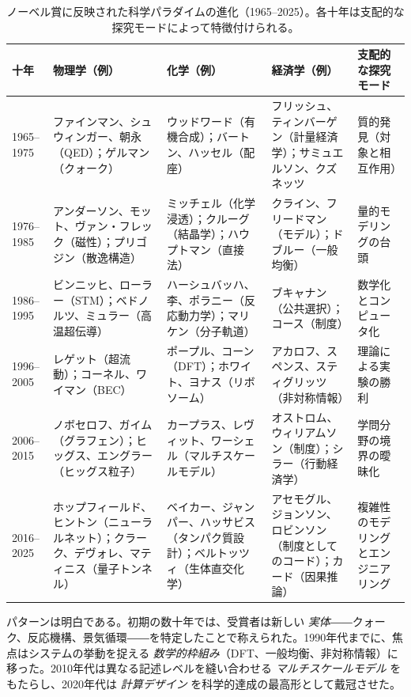 \documentclass[12pt,a4paper]{article}
\begin{document}
	\begin{table}[htbp]
		\centering
		\caption{ノーベル賞に反映された科学パラダイムの進化（1965–2025）。各十年は支配的な探究モードによって特徴付けられる。}
		\label{tab:nobel}
		\small
		\begin{tabular}{p{2.5cm}p{3.5cm}p{3.5cm}p{2.5cm}p{2.8cm}}
			\toprule
			\textbf{十年} & \textbf{物理学（例）} & \textbf{化学（例）} & \textbf{経済学（例）} & \textbf{支配的な探究モード} \\
			\midrule
			1965–1975 & ファインマン、シュウィンガー、朝永（QED）；ゲルマン（クォーク） & ウッドワード（有機合成）；バートン、ハッセル（配座） & フリッシュ、ティンバーゲン（計量経済学）；サミュエルソン、クズネッツ & 質的発見（対象と相互作用） \\
			1976–1985 & アンダーソン、モット、ヴァン・フレック（磁性）；プリゴジン（散逸構造） & ミッチェル（化学浸透）；クルーグ（結晶学）；ハウプトマン（直接法） & クライン、フリードマン（モデル）；ドブルー（一般均衡） & 量的モデリングの台頭 \\
			1986–1995 & ビンニッヒ、ローラー（STM）；ベドノルツ、ミュラー（高温超伝導） & ハーシュバッハ、李、ポラニー（反応動力学）；マリケン（分子軌道） & ブキャナン（公共選択）；コース（制度） & 数学化とコンピュータ化 \\
			1996–2005 & レゲット（超流動）；コーネル、ワイマン（BEC） & ポープル、コーン（DFT）；ホワイト、ヨナス（リボソーム） & アカロフ、スペンス、スティグリッツ（非対称情報） & 理論による実験の勝利 \\
			2006–2015 & ノボセロフ、ガイム（グラフェン）；ヒッグス、エングラー（ヒッグス粒子） & カープラス、レヴィット、ワーシェル（マルチスケールモデル） & オストロム、ウィリアムソン（制度）；シラー（行動経済学） & 学問分野の境界の曖昧化 \\
			2016–2025 & ホップフィールド、ヒントン（ニューラルネット）；クラーク、デヴォレ、マティニス（量子トンネル） & ベイカー、ジャンパー、ハッサビス（タンパク質設計）；ベルトッツィ（生体直交化学） & アセモグル、ジョンソン、ロビンソン（制度としてのコード）；カード（因果推論） & 複雑性のモデリングとエンジニアリング \\
			\bottomrule
		\end{tabular}
	\end{table}
	
	パターンは明白である。初期の数十年では、受賞者は新しい \emph{実体}――クォーク、反応機構、景気循環――を特定したことで称えられた。1990年代までに、焦点はシステムの挙動を捉える \emph{数学的枠組み}（DFT、一般均衡、非対称情報）に移った。2010年代は異なる記述レベルを縫い合わせる \emph{マルチスケールモデル} をもたらし、2020年代は \emph{計算デザイン} を科学的達成の最高形として戴冠させた。
	
\end{document}
